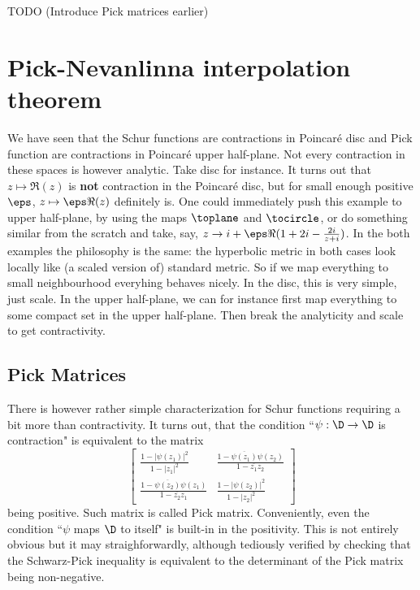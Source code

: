 TODO (Introduce Pick matrices earlier)

\section{Pick-Nevanlinna interpolation theorem}

We have seen that the Schur functions are contractions in Poincaré disc and Pick function are contractions in Poincaré upper half-plane. Not every contraction in these spaces is however analytic. Take disc for instance. It turns out that $z \mapsto \Re(z)$ is \textbf{not} contraction in the Poincaré disc, but for small enough positive $\eps$, $z \mapsto \eps \Re(z)$ definitely is. One could immediately push this example to upper half-plane, by using the maps $\toplane$ and $\tocircle$, or do something similar from the scratch and take, say, $z \to i + \eps \Re(1 + 2 i - \frac{2 i}{z + i})$. In the both examples the philosophy is the same: the hyperbolic metric in both cases look locally like (a scaled version of) standard metric. So if we map everything to small neighbourhood everyhing behaves nicely. In the disc, this is very simple, just scale. In the upper half-plane, we can for instance first map everything to some compact set in the upper half-plane. Then break the analyticity and scale to get contractivity.

\subsection{Pick Matrices}

There is however rather simple characterization for Schur functions requiring a bit more than contractivity. It turns out, that the condition ``$\psi : \D \to \D$ is contraction" is equivalent to the matrix
\[
	\begin{bmatrix}
		\frac{1 - |\psi(z_{1})|^{2}}{1 - |z_{1}|^{2}} & \frac{1 - \overline{\psi(z_{1})} \psi(z_{2})}{1 - \overline{z_{1}} z_{2}} \\
		\frac{1 - \overline{\psi(z_{2})} \psi(z_{1})}{1 - \overline{z_{2}} z_{1}} & \frac{1 - |\psi(z_{2})|^{2}}{1 - |z_{2}|^{2}}
	\end{bmatrix}
\]
being positive. Such matrix is called Pick matrix. Conveniently, even the condition ``$\psi$ maps $\D$ to itself" is built-in in the positivity. This is not entirely obvious but it may straighforwardly, although tediously verified by checking that the Schwarz-Pick inequality is equivalent to the determinant of the Pick matrix being non-negative.

